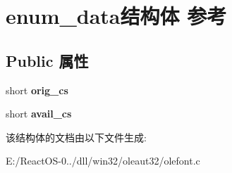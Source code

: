 \hypertarget{structenum__data}{}\section{enum\+\_\+data结构体 参考}
\label{structenum__data}
\subsection*{Public 属性}
\begin{DoxyCompactItemize}
\item 
\mbox{\label{structenum__data_a1e3181db68033e3b5558ceee8212f2e6}} 
short {\bfseries orig\+\_\+cs}
\item 
\mbox{\label{structenum__data_a47550af3c02d3943254945c99a2e7d98}} 
short {\bfseries avail\+\_\+cs}
\end{DoxyCompactItemize}


该结构体的文档由以下文件生成\+:\begin{DoxyCompactItemize}
\item 
E\+:/\+React\+O\+S-\/0../dll/win32/oleaut32/olefont.\+c\end{DoxyCompactItemize}
